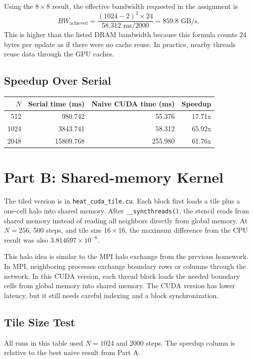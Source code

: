 \documentclass[11pt]{article}
\begin{document}
Using the \(8\times8\) result, the effective bandwidth requested in the
assignment is
\[
BW_{\text{achieved}} =
\frac{(1024-2)^2 \times 24}{58.312\text{ ms}/2000}
= 859.8 \text{ GB/s}.
\]
This is higher than the listed DRAM bandwidth because this formula counts
24 bytes per update as if there were no cache reuse. In practice, nearby
threads reuse data through the GPU caches.

\subsection{Speedup Over Serial}

\begin{center}
\begin{tabular}{rrrr}
\toprule
\(N\) & Serial time (ms) & Naive CUDA time (ms) & Speedup \\
\midrule
512 & 980.742 & 55.376 & 17.71x \\
1024 & 3843.741 & 58.312 & 65.92x \\
2048 & 15809.768 & 255.980 & 61.76x \\
\bottomrule
\end{tabular}
\end{center}

\section{Part B: Shared-memory Kernel}

The tiled version is in \texttt{heat\_cuda\_tile.cu}. Each block first loads a
tile plus a one-cell halo into shared memory. After \texttt{\_\_syncthreads()},
the stencil reads from shared memory instead of reading all neighbors directly
from global memory. At \(N=256\), 500 steps, and tile size \(16\times16\), the
maximum difference from the CPU result was also \(3.814697\times10^{-6}\).

This halo idea is similar to the MPI halo exchange from the previous homework.
In MPI, neighboring processes exchange boundary rows or columns through the
network. In this CUDA version, each thread block loads the needed boundary cells
from global memory into shared memory. The CUDA version has lower latency, but
it still needs careful indexing and a block synchronization.

\subsection{Tile Size Test}

All runs in this table used \(N=1024\) and 2000 steps. The speedup column is
relative to the best naive result from Part A.
\end{document}
